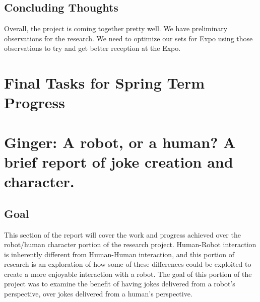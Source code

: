 \documentclass[onecolumn, draftclsnofoot,10pt, compsoc]{IEEEtran}
\begin{document}
\subsection{Concluding Thoughts}
Overall, the project is coming together pretty well. We have preliminary observations for the research. We need to optimize our sets for Expo using those observations to try and get better reception at the Expo. 

\section{Final Tasks for Spring Term Progress}







\section{Ginger: A robot, or a human? A brief report of joke creation and character.}
\subsection{Goal}
This section of the report will cover the work and progress achieved over the robot/human character portion of the research project. Human-Robot interaction is inherently different from Human-Human interaction, and this portion of research is an exploration of how some of these differences could be exploited to create a more enjoyable interaction with a robot. The goal of this portion of the project was to examine the benefit of having jokes delivered from a robot's perspective, over jokes delivered from a human's perspective.
\end{document}
